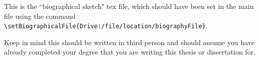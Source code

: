 This is the ``biographical sketch" tex file, which should have been set in the main file using the command \verb|\setBiographicalFile{Drive:/file/location/biographyFile}|.

Keep in mind this should be written in third person and should assume you have already completed your degree that you are writing this thesis or dissertation for. 